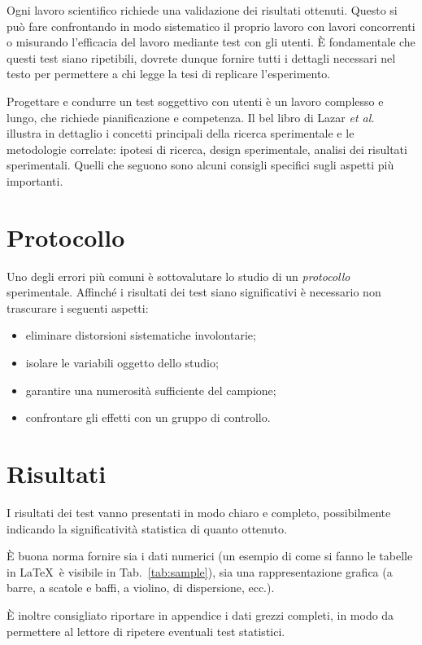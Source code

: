 \documentclass[12pt,italian]{report}
\begin{document}
Ogni lavoro scientifico richiede una validazione dei risultati ottenuti. Questo si può fare confrontando in modo sistematico il proprio lavoro con lavori concorrenti o misurando l'efficacia del lavoro mediante test con gli utenti. \`E fondamentale che questi test siano ripetibili, dovrete dunque fornire tutti i dettagli necessari nel testo per permettere a chi legge la tesi di replicare l'esperimento.

Progettare e condurre un test soggettivo con utenti \`e un lavoro complesso e lungo, che richiede pianificazione e competenza. Il bel libro di Lazar {\em et al.}~\cite{lazar2017methods} illustra in dettaglio i concetti principali della ricerca sperimentale e le metodologie correlate: ipotesi di ricerca, design sperimentale, analisi dei risultati sperimentali. Quelli che seguono sono alcuni consigli specifici sugli aspetti pi\`u importanti.

\section{Protocollo}

Uno degli errori più comuni è sottovalutare lo studio di un \textit{protocollo} sperimentale. Affinché i risultati dei test siano significativi è necessario non trascurare i seguenti aspetti:

\begin{itemize}
	\item eliminare distorsioni sistematiche involontarie;
	\item isolare le variabili oggetto dello studio;
	\item garantire una numerosità sufficiente del campione;
	\item confrontare gli effetti con un gruppo di controllo.
\end{itemize}

\section{Risultati}

I risultati dei test vanno presentati in modo chiaro e completo, possibilmente indicando la significatività statistica di quanto ottenuto.

\`E buona norma fornire sia i dati numerici (un esempio di come si fanno le tabelle in \LaTeX\  è visibile in Tab.\ \ref{tab:sample}), sia una rappresentazione grafica (a barre, a scatole e baffi, a violino, di dispersione, ecc.).

\`E inoltre consigliato riportare in appendice i dati grezzi completi, in modo da permettere al lettore di ripetere eventuali test statistici.
\end{document}
